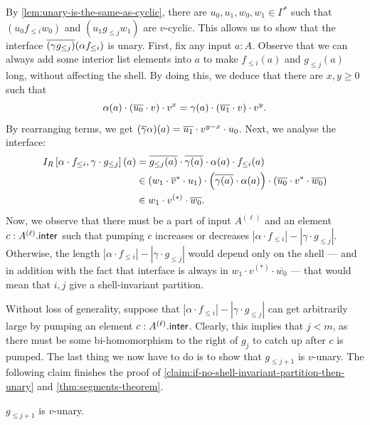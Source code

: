 By \cref{lem:unary-is-the-same-as-cyclic}, there are $u_0, u_1, w_0, w_1 \in \Gamma^*$ such that $(u_0 f_{\leq i} w_0)$ and $(u_1 g_{\leq j} w_1)$ are $v$-cyclic. This allows us to show that the interface $\overline{(\gamma g_{\leq j})}(\alpha f_{\leq i})$ is unary. First, fix any input $a : A$. Observe that we can always add some interior list elements into $a$ to make $f_{\leq i}(a)$ and $g_{\leq j}(a)$ long, without affecting the shell. By doing this, we deduce that there are $x, y \geq 0$ such that
\[
    \alpha(a) \cdot (\overline{u_0} \cdot v) \cdot v^x = \gamma(a) \cdot (\overline{u_1} \cdot v) \cdot v^y.
\]
By rearranging terms, we get $(\overline{\gamma} \alpha)(a) = \overline{u_1} \cdot v^{y-x} \cdot u_0$. Next, we analyse the interface:
\begin{align*}
    I_R \left[ \alpha \cdot f_{\leq i}, \gamma \cdot g_{\leq j} \right](a) &= \overline{g_{\leq j}(a)} \cdot \overline{\gamma(a)} \cdot \alpha(a) \cdot f_{\leq i}(a) \\ &\in (w_1 \cdot \overline{v}^* \cdot u_1) \cdot \left( \overline{\gamma(a)} \cdot \alpha(a) \right) \cdot (\overline{u_0} \cdot v^* \cdot \overline{w_0}) \\
    &\in w_1 \cdot v^{(*)} \cdot \overline{w_0}.
\end{align*}
Now, we observe that there must be a part of input $A^{(\ell)}$ and an element $c : A^{(\ell)} . \mathsf{inter}$ such that pumping $c$ increases or decreases $|\alpha \cdot f_{\leq i}| - |\gamma \cdot g_{\leq j}|$. Otherwise, the length $|\alpha \cdot f_{\leq i}| - |\gamma \cdot g_{\leq j}|$ would depend only on the shell --- and in addition with the fact that interface is always in $w_1 \cdot v^{(*)} \cdot \overline{w_0}$ --- that would mean that $i,j$ give a shell-invariant partition.

Without loss of generality, suppose that $|\alpha \cdot f_{\leq i}| - |\gamma \cdot g_{\leq j}|$ can get arbitrarily large by pumping an element $c : A^{(\ell)} . \mathsf{inter}$. Clearly, this implies that $j < m$, as there must be some bi-homomorphism to the right of $g_j$ to catch up after $c$ is pumped. The last thing we now have to do is to show that $g_{\leq j+1}$ is $v$-unary. The following claim finishes the proof of \cref{claim:if-no-shell-invariant-partition-then-unary} and \cref{thm:segments-theorem}.

\begin{claim}
    $g_{\leq j+1}$ is $v$-unary.
\end{claim}

